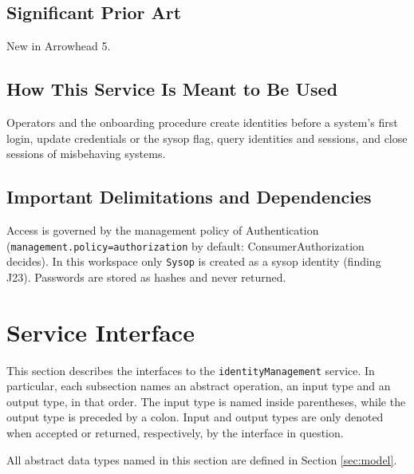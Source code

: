 \documentclass[a4paper]{arrowhead}
\begin{document}
\subsection{Significant Prior Art}

New in Arrowhead 5.

\subsection{How This Service Is Meant to Be Used}

Operators and the onboarding procedure create identities before a system's first login, update credentials or the sysop flag, query identities and sessions, and close sessions of misbehaving systems.

\subsection{Important Delimitations and Dependencies}
\label{sec:delimitations}

Access is governed by the management policy of Authentication (\texttt{management.\allowbreak{}policy=\allowbreak{}authorization} by default: Consumer\allowbreak{}Authorization decides). In this workspace only \texttt{Sysop} is created as a sysop identity (finding J23). Passwords are stored as hashes and never returned.

\newpage

\section{Service Interface}
\label{sec:operations}

This section describes the interfaces to the \texttt{identityManagement} service.
In particular, each subsection names an abstract operation, an input type and an output type, in that order.
The input type is named inside parentheses, while the output type is preceded by a colon.
Input and output types are only denoted when accepted or returned, respectively, by the interface in question.

All abstract data types named in this section are defined in Section \ref{sec:model}.
\end{document}
